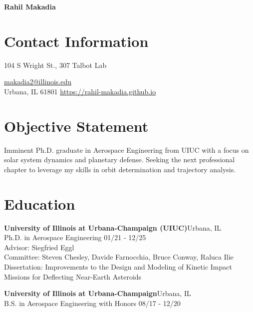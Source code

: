 \documentclass[margin,line]{res}
\newlength{\myspacing}
\newif\ifphone
\begin{document}
\hspace{\myspacing}
\hspace{2.2in}
\huge{\bf Rahil Makadia}

\normalsize
\begin{resume}

\section{\sc Contact Information}
104 S Wright St., 307 Talbot Lab \hfill
\ifphone
 \textbar\,
\fi
\href{mailto:makadia2@illinois.edu}{makadia2@illinois.edu}\\
Urbana, IL 61801 \hfill
\href{https://rahil-makadia.github.io/}{https://rahil-makadia.github.io}

\section{\sc Objective Statement}
Imminent Ph.D. graduate in Aerospace Engineering from UIUC with a focus on solar system dynamics and planetary defense. Seeking the next professional chapter to leverage my skills in orbit determination and trajectory analysis.

\section{\sc Education}
{\bf University of Illinois at Urbana-Champaign (UIUC)}\hfill Urbana, IL\\
Ph.D. in Aerospace Engineering \hfill {01/21 - 12/25}\\
Advisor: Siegfried Eggl\\
Committee: Steven Chesley, Davide Farnocchia, Bruce Conway, Raluca Ilie\\
Dissertation: Improvements to the Design and Modeling of Kinetic Impact Missions for Deflecting Near-Earth Asteroids

{\bf University of Illinois at Urbana-Champaign}\hfill Urbana, IL\\
B.S. in Aerospace Engineering with Honors \hfill {08/17 - 12/20}


\end{resume}
\end{document}
